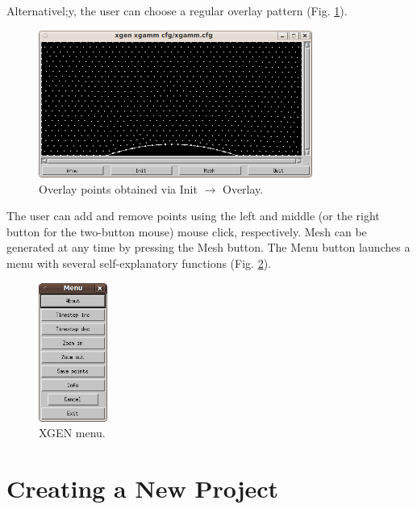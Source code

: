 \documentclass[12pt]{article}
\begin{document}
\newpage
\noindent
Alternativel;y, the user can choose a regular overlay pattern (Fig. \ref{fig:overlay}). 

  \begin{figure}[!ht]
  \begin{center}
  \includegraphics[width=0.8\textwidth]{xgen-1.png}
  \end{center}
  \vspace{-6mm}
  \caption{Overlay points obtained via Init $\rightarrow$ Overlay.}
  \label{fig:overlay}
  \end{figure}
\noindent 
  The user can add and remove points using the left and middle  
  (or the right button for the two-button mouse) mouse click,
  respectively. Mesh can be generated at any time by pressing the Mesh button.
  The Menu button launches a menu with several self-explanatory functions
  (Fig. \ref{fig:menu}). 

  \begin{figure}[!ht]
  \begin{center}
  \includegraphics[width=0.2\textwidth]{xgen-3.png}
  \end{center}
  \vspace{-6mm}
  \caption{XGEN menu.}
  \label{fig:menu}
  \end{figure}
\noindent 




  \section{Creating a New Project} \label{new-project}
\end{document}
